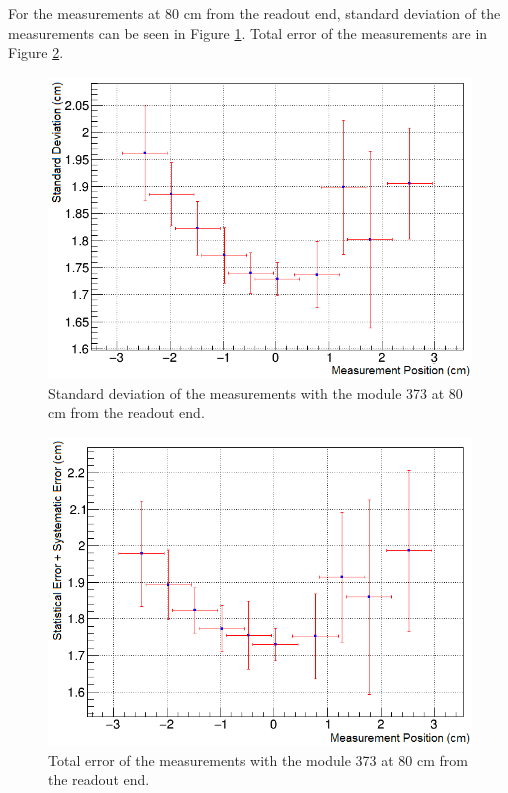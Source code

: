 \documentclass[a4paper]{article}\linespread{1.4}
\begin{document}
For the measurements at 80 cm from the readout end, standard deviation of the measurements can be seen in Figure \ref{fig:73s}. Total error of the measurements are in Figure \ref{fig:73e}. 
\begin{figure}[h!] \hspace*{-0cm} \includegraphics[width=120mm,scale=2.0]{figures/73s.png} \caption{Standard deviation of the measurements with the module 373 at 80 cm from the readout end.}  \label{fig:73s}\end{figure}
\begin{figure}[h!] \hspace*{-0cm} \includegraphics[width=120mm,scale=2.0]{figures/73e.png} \caption{Total error of the measurements with the module 373 at 80 cm from the readout end.}  \label{fig:73e}\end{figure}
\end{document}
